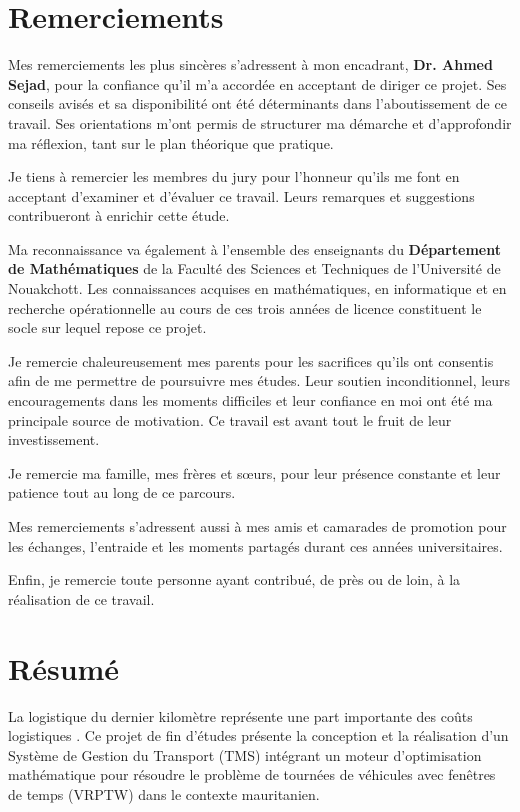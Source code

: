 \documentclass[12pt,a4paper]{report}
\begin{document}
\chapter*{Remerciements}
\thispagestyle{empty}

Mes remerciements les plus sincères s'adressent à mon encadrant, \textbf{Dr. Ahmed Sejad}, pour la confiance qu'il m'a accordée en acceptant de diriger ce projet. Ses conseils avisés et sa disponibilité ont été déterminants dans l'aboutissement de ce travail. Ses orientations m'ont permis de structurer ma démarche et d'approfondir ma réflexion, tant sur le plan théorique que pratique.

Je tiens à remercier les membres du jury pour l'honneur qu'ils me font en acceptant d'examiner et d'évaluer ce travail. Leurs remarques et suggestions contribueront à enrichir cette étude.

Ma reconnaissance va également à l'ensemble des enseignants du \textbf{Département de Mathématiques} de la Faculté des Sciences et Techniques de l'Université de Nouakchott. Les connaissances acquises en mathématiques, en informatique et en recherche opérationnelle au cours de ces trois années de licence constituent le socle sur lequel repose ce projet.

Je remercie chaleureusement mes parents pour les sacrifices qu'ils ont consentis afin de me permettre de poursuivre mes études. Leur soutien inconditionnel, leurs encouragements dans les moments difficiles et leur confiance en moi ont été ma principale source de motivation. Ce travail est avant tout le fruit de leur investissement.

Je remercie ma famille, mes frères et s\oe urs, pour leur présence constante et leur patience tout au long de ce parcours.

Mes remerciements s'adressent aussi à mes amis et camarades de promotion pour les échanges, l'entraide et les moments partagés durant ces années universitaires.

Enfin, je remercie toute personne ayant contribué, de près ou de loin, à la réalisation de ce travail.

\clearpage

\chapter*{Résumé}

La logistique du dernier kilomètre représente une part importante des coûts logistiques \cite{gevaers2011cost}. Ce projet de fin d'études présente la conception et la réalisation d'un Système de Gestion du Transport (TMS) intégrant un moteur d'optimisation mathématique pour résoudre le problème de tournées de véhicules avec fenêtres de temps (VRPTW) dans le contexte mauritanien.
\end{document}
